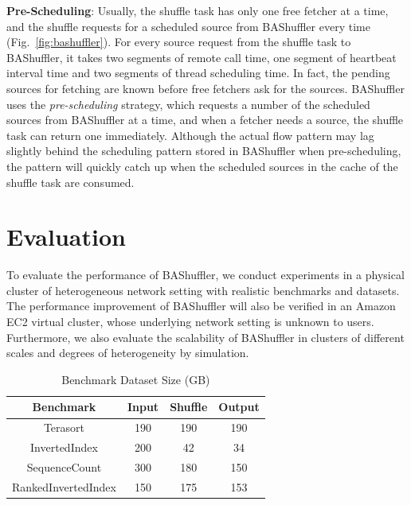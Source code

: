 \documentclass[10pt,journal,compsoc]{IEEEtran}
\begin{document}
\textbf{Pre-Scheduling}:
Usually, the shuffle task has only one free fetcher at a time,
and the shuffle requests for a scheduled source from BAShuffler every time (Fig.~\ref{fig:bashuffler}). 
For every source request from the shuffle task to BAShuffler, 
it takes two segments of remote call time, one segment of heartbeat
interval time and two segments of thread scheduling time.
In fact, the pending sources for fetching are known before free
fetchers ask for the sources.
BAShuffler uses the \emph{pre-scheduling} strategy, which requests
a number of the scheduled sources from BAShuffler at a time,
and when a fetcher needs a source, the shuffle task can return one
immediately. Although the actual flow pattern may lag slightly behind
the scheduling pattern stored in BAShuffler when pre-scheduling,
the pattern will quickly catch up when the scheduled sources in the cache of
the shuffle task are consumed.


\section{Evaluation}\label{section:evaluation}
To evaluate the performance of BAShuffler, 
we conduct experiments in a physical cluster of heterogeneous
network setting with realistic benchmarks and datasets.
The performance improvement of BAShuffler will also be verified in an
Amazon EC2 virtual cluster, whose underlying network setting is
unknown to users.
Furthermore, we also evaluate the scalability of BAShuffler in
clusters of different scales and degrees of heterogeneity by simulation.


\begin{table}[!t]
\renewcommand{\arraystretch}{1}
\caption{Benchmark Dataset Size (GB)}
\label{table:benchmark}
\centering
\begin{tabularx}{.4\textwidth}{c||c|c|c}
\hline
\textbf{Benchmark} & \textbf{Input} & \textbf{Shuffle} & \textbf{Output} \\
\hline
Terasort & 190 & 190 & 190\\
\hline
InvertedIndex & 200 & 42 & 34 \\
\hline
SequenceCount & 300 & 180 & 150 \\
\hline
RankedInvertedIndex & 150 & 175 & 153\\
\hline
\end{tabularx}
\end{table}
\end{document}

